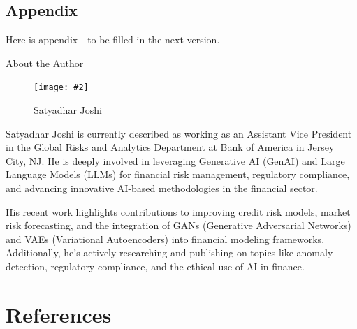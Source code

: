 \documentclass[a4paper,headinclude=on,footinclude=on,12pt,oneside]{scrbook}
\newcommand{\standardfigure}[3]{\begin{figure}[H]\begin{center}\texttt{[image: \#2]}\caption{#3}\label{fig:#2}\end{center}\end{figure}}
\begin{document}
\begin{appendices}
	
	\chapter*{Appendix }
	
	Here is appendix - to be filled in the next version.
	
	
	
\end{appendices}

\printindex
{}


About the Author

\standardfigure{\textwidth/2}{images/about/author_joshi}{Satyadhar Joshi}

Satyadhar Joshi is currently described as working as an Assistant Vice President in the Global Risks and Analytics Department at Bank of America in Jersey City, NJ. He is deeply involved in leveraging Generative AI (GenAI) and Large Language Models (LLMs) for financial risk management, regulatory compliance, and advancing innovative AI-based methodologies in the financial sector.

His recent work highlights contributions to improving credit risk models, market risk forecasting, and the integration of GANs (Generative Adversarial Networks) and VAEs (Variational Autoencoders) into financial modeling frameworks. Additionally, he's actively researching and publishing on topics like anomaly detection, regulatory compliance, and the ethical use of AI in finance.




\chapter*{References}
\end{document}
